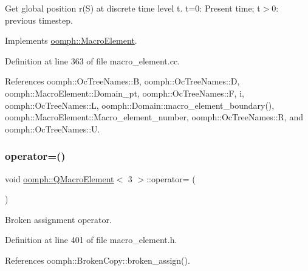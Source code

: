 Get global position r(\+S) at discrete time level t. t=0\+: Present time; t$>$0\+: previous timestep. 



Implements \hyperlink{classoomph_1_1MacroElement_a819b095e97c92e634d6216ddce00c8a2}{oomph\+::\+Macro\+Element}.



Definition at line 363 of file macro\+\_\+element.\+cc.



References oomph\+::\+Oc\+Tree\+Names\+::B, oomph\+::\+Oc\+Tree\+Names\+::D, oomph\+::\+Macro\+Element\+::\+Domain\+\_\+pt, oomph\+::\+Oc\+Tree\+Names\+::F, i, oomph\+::\+Oc\+Tree\+Names\+::L, oomph\+::\+Domain\+::macro\+\_\+element\+\_\+boundary(), oomph\+::\+Macro\+Element\+::\+Macro\+\_\+element\+\_\+number, oomph\+::\+Oc\+Tree\+Names\+::R, and oomph\+::\+Oc\+Tree\+Names\+::U.

\mbox{\label{classoomph_1_1QMacroElement_3_013_01_4_ac2cf031abc3bf899a8faca572af67d76}} 
\subsubsection{\texorpdfstring{operator=()}{operator=()}}
{\footnotesize\ttfamily void \hyperlink{classoomph_1_1QMacroElement}{oomph\+::\+Q\+Macro\+Element}$<$ 3 $>$\+::operator= (\begin{DoxyParamCaption}\item[{const \hyperlink{classoomph_1_1QMacroElement}{Q\+Macro\+Element}$<$ 3 $>$ \&}]{ }\end{DoxyParamCaption})\hspace{0.3cm}{\ttfamily [inline]}}



Broken assignment operator. 



Definition at line 401 of file macro\+\_\+element.\+h.



References oomph\+::\+Broken\+Copy\+::broken\+\_\+assign().

\mbox{\label{classoomph_1_1QMacroElement_3_013_01_4_a5c1916d58b2d3142b5fa85f209e16b4c}} 
